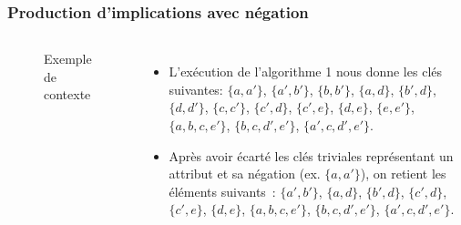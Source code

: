 \documentclass[french]{beamer}
\begin{document}
\begin{frame}
\frametitle{Production d'implications avec négation}
\begin{columns}[t] %
\begin{figure}[h]
\begin{center}
\begin{cxt}%
\cxtName{}%
%
%
%
%
%
\end{cxt}
\end{center}
\caption{Exemple de contexte \context}
\end{figure}
\begin{itemize}
\item L'exécution de l'algorithme 1 nous donne les clés suivantes: $\{a, a'\}$, $\{a', b'\}$, $\{b, b'\}$, $\{a, d\}$, $\{b', d\}$, $\{d, d'\}$, $\{c, c'\}$, $\{c', d\}$, $\{c', e\}$, $\{d, e\}$, $\{e, e'\}$, $\{a, b, c, e'\}$, $\{b, c, d', e'\}$, $\{a', c, d', e'\}$.
\item Après avoir écarté les clés triviales représentant un attribut et sa négation (ex. $\{a, a'\}$), on retient les éléments suivants~: $\{a', b'\}$, $\{a, d\}$, $\{b', d\}$, $\{c', d\}$, $\{c', e\}$, $\{d, e\}$, $\{a, b, c, e'\}$, $\{b, c, d', e'\}$, $\{a', c, d', e'\}$.
\end{itemize}
\end{columns}
\end{frame}
\end{document}
